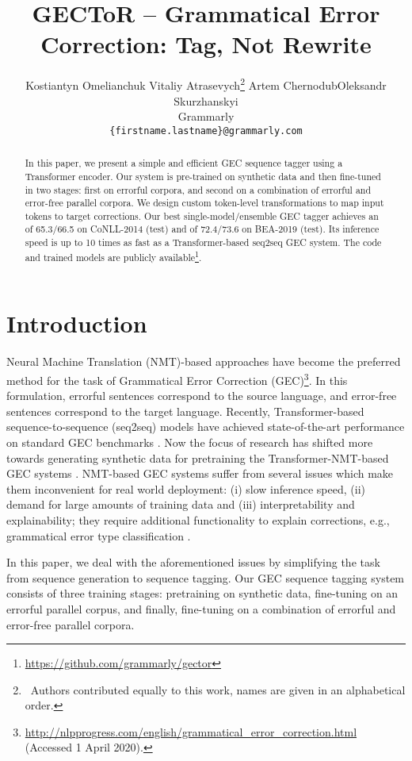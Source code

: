 \documentclass[11pt,a4paper]{article}
\title{GECToR -- Grammatical Error Correction: Tag, Not Rewrite}
\author{Kostiantyn Omelianchuk \qquad Vitaliy Atrasevych\thanks{~Authors  contributed equally to this work, names are given in an alphabetical order.} \quad Artem Chernodub\footnotemark[1] \qquad Oleksandr Skurzhanskyi\footnotemark[1]\\
Grammarly \\
{\tt \{firstname.lastname\}@grammarly.com} \\}
\date{}
\begin{document}
\maketitle

\begin{abstract}
{In this paper, we present a simple and efficient GEC sequence tagger using a Transformer encoder. Our system is pre-trained on synthetic data and then fine-tuned in two stages: first on errorful corpora, and second on a combination of errorful and error-free parallel corpora. We design custom token-level transformations to map input tokens to target corrections. Our best single-model/ensemble GEC tagger achieves an  of 65.3/66.5 on CoNLL-2014 (test) and  of 72.4/73.6 on BEA-2019 (test). Its inference speed is up to 10 times as fast as a Transformer-based seq2seq GEC system. The code and trained models are publicly available\footnote{\url{https://github.com/grammarly/gector}}.}
\end{abstract}

\section{Introduction}

Neural Machine Translation (NMT)-based approaches \cite{sennrich2016edinburgh} have become the preferred method for the task of Grammatical Error Correction (GEC)\footnote{\url{http://nlpprogress.com/english/grammatical_error_correction.html} (Accessed 1 April 2020).}. In this formulation, errorful sentences correspond to the source language, and error-free sentences correspond to the target language. Recently, Transformer-based \cite{vaswani2017attention} sequence-to-sequence (seq2seq) models have achieved state-of-the-art performance on standard GEC benchmarks \cite{bryant2019bea}. Now the focus of research has shifted more towards generating synthetic data for pretraining the Transformer-NMT-based GEC systems \cite{grundkiewicz2019neural, kiyono2019empirical}.
NMT-based GEC systems suffer from several issues which make them inconvenient for real world deployment: (i) slow inference speed, (ii) demand for large amounts of training data and  (iii) interpretability and explainability; they require additional functionality to explain corrections, e.g., grammatical error type classification \cite{bryant2017automatic}. 

In this paper, we deal with the aforementioned issues by simplifying the task from sequence generation to sequence tagging. Our GEC sequence tagging system consists of three training stages: pretraining on synthetic data, fine-tuning on an errorful parallel corpus, and finally, fine-tuning on a combination of errorful and error-free parallel corpora. 
\end{document}

